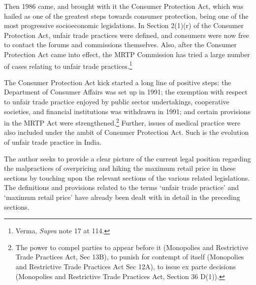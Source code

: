 \begin{multicols}{2}
\vspace{-.15cm}

\noi
Then 1986 came, and brought with it the Consumer Protection Act, which was hailed as one of
the greatest steps towards consumer protection, being one of the most progressive socioeconomic legislations. In Section 2(1)(r) of the Consumer Protection Act, unfair trade practices
were defined, and consumers were now free to contact the forums and commissions
themselves. Also, after the Consumer Protection Act came into effect, the MRTP Commission
has tried a large number of cases relating to unfair trade practices.\footnote{Verma, \textit{Supra} note 17 at 114.}

\vspace{-.15cm}

\noi
The Consumer Protection Act kick started a long line of positive steps: the Department of
Consumer Affairs was set up in 1991; the exemption with respect to unfair trade practice
enjoyed by public sector undertakings, cooperative societies, and financial institutions was
withdrawn in 1991; and certain provisions in the MRTP Act were strengthened.\footnote{The power to compel parties to appear before it (Monopolies and Restrictive Trade Practices Act, Sec 13B),
to punish for contempt of itself (Monopolies and Restrictive Trade Practices Act Sec 12A), to issue ex parte decisions (Monopolies and Restrictive Trade Practices Act, Section 36 D(1)).} Further, issues of medical practice were also included under the ambit of Consumer Protection Act.
Such is the evolution of unfair trade practice in India.


\vspace{.15cm}



\vspace{.15cm}

\noi
The author seeks to provide a clear picture of the current legal position regarding the
malpractices of overpricing and hiking the maximum retail price in these sections by touching
upon the relevant sections of the various related legislations. The definitions and provisions
related to the terms ‘unfair trade practice’ and ‘maximum retail price’ have already been dealt
with in detail in the preceding sections.


\end{multicols}
